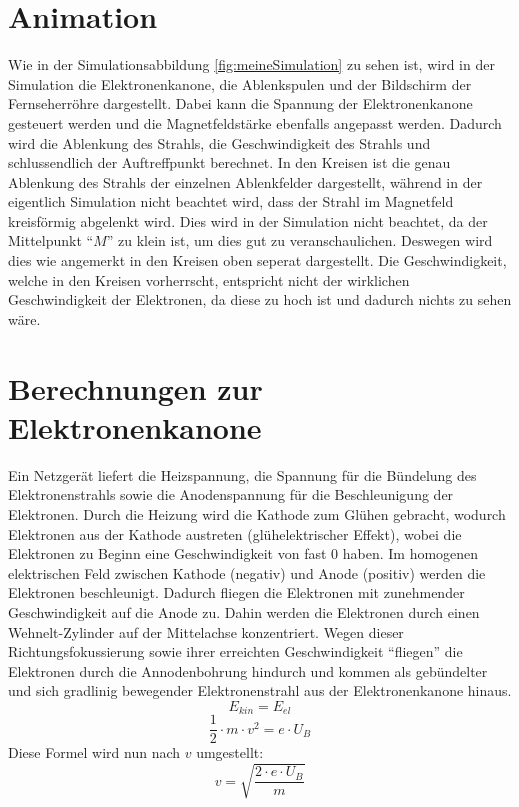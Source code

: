 \section{Animation}
Wie in der Simulationsabbildung \ref{fig:meineSimulation} zu sehen ist, wird in der Simulation die Elektronenkanone, die Ablenkspulen und der Bildschirm der Fernseherröhre dargestellt. 
Dabei kann die Spannung der Elektronenkanone gesteuert werden und die Magnetfeldstärke ebenfalls angepasst werden.
Dadurch wird die Ablenkung des Strahls, die Geschwindigkeit des Strahls und schlussendlich der Auftreffpunkt berechnet.
In den Kreisen ist die genau Ablenkung des Strahls der einzelnen Ablenkfelder dargestellt, während in der eigentlich Simulation nicht beachtet wird, dass der Strahl im Magnetfeld kreisförmig abgelenkt wird.
Dies wird in der Simulation nicht beachtet, da der Mittelpunkt "`$M$"' zu klein ist, um dies gut zu veranschaulichen.
Deswegen wird dies wie angemerkt in den Kreisen oben seperat dargestellt.
Die Geschwindigkeit, welche in den Kreisen vorherrscht, entspricht nicht der wirklichen Geschwindigkeit der Elektronen, da diese zu hoch ist und dadurch nichts zu sehen wäre.
\label{sec:animation}



\section{Berechnungen zur Elektronenkanone}

\label{sec:tolle-section}
 
Ein Netzgerät liefert die Heizspannung, die Spannung für die Bündelung des Elektronenstrahls sowie die Anodenspannung für die Beschleunigung der Elektronen.
Durch die Heizung wird die Kathode zum Glühen gebracht, wodurch Elektronen aus der Kathode austreten (glühelektrischer Effekt), wobei die Elektronen zu Beginn eine Geschwindigkeit von fast $0$ haben.
Im homogenen elektrischen Feld zwischen Kathode (negativ) und Anode (positiv) werden die Elektronen beschleunigt.
Dadurch fliegen die Elektronen mit zunehmender Geschwindigkeit auf die Anode zu.
Dahin werden die Elektronen durch einen Wehnelt-Zylinder auf der Mittelachse konzentriert.
Wegen dieser Richtungsfokussierung sowie ihrer erreichten Geschwindigkeit "`fliegen"' die Elektronen durch die Annodenbohrung hindurch und kommen als gebündelter und sich gradlinig bewegender Elektronenstrahl aus der Elektronenkanone hinaus.
$$ E_{kin} = E_{el}$$
$$ \frac{1}{2} \cdot m \cdot v^2 = e \cdot U_B$$
Diese Formel wird  nun nach $v$ umgestellt:
\begin{equation}
\label{eq:v}
   v = \sqrt{\frac{2 \cdot e \cdot U_B}{m}} 
\end{equation}
$$ $$

